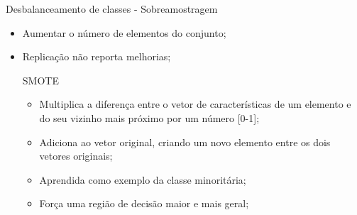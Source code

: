 \documentclass{beamer}
\begin{document}
\begin{frame}{Desbalanceamento de classes - Sobreamostragem}
\setlength\leftmargini{0em}
\justifying
    \begin{itemize}
        \item Aumentar o número de elementos do conjunto;
        \item Replicação não reporta melhorias;
    \begin{block}{SMOTE}
    \justifying
\setlength\leftmargini{1em}
        \begin{itemize}
            \item Multiplica a diferença entre o vetor de características de um elemento e do seu vizinho mais próximo por um número [0-1];
            \item Adiciona ao vetor original, criando um novo elemento entre os dois vetores originais;
            \item Aprendida como exemplo da classe minoritária;
            \item Força uma região de decisão maior e mais geral;
        \end{itemize}
    \end{block}
    \end{itemize}







\end{frame}
\end{document}
